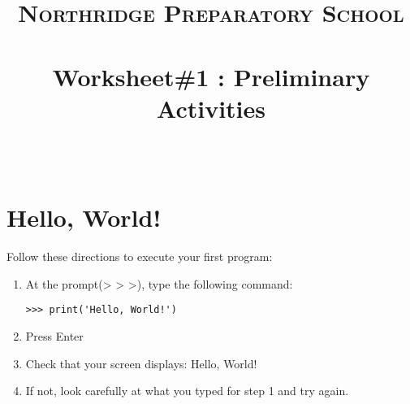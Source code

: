 \documentclass[paper=a4, fontsize=11pt]{scrartcl} %
\title{	
\normalfont \normalsize 
\textsc{Northridge Preparatory School} \\ [25pt] %
\horrule{0.5pt} \\[0.4cm] %
\huge Worksheet\#1 : Preliminary Activities \\ %
\horrule{2pt} \\[0.5cm] %
}
\author{} %
\date{} %
\numberwithin{equation}{section} %
\numberwithin{figure}{section} %
\numberwithin{table}{section} %
\begin{document}
\maketitle %


\section{Hello, World!}

Follow these directions to execute your first program:

\begin{enumerate}

\item At the prompt(> > >), type the following command:  

\begin{framed}
\begin{lstlisting}
>>> print('Hello, World!')
\end{lstlisting}
\end{framed}

\item Press Enter

\item Check that your screen displays: Hello, World!

\item If not, look carefully at what you typed for step 1 and try again.


\end{enumerate}


\end{document}

